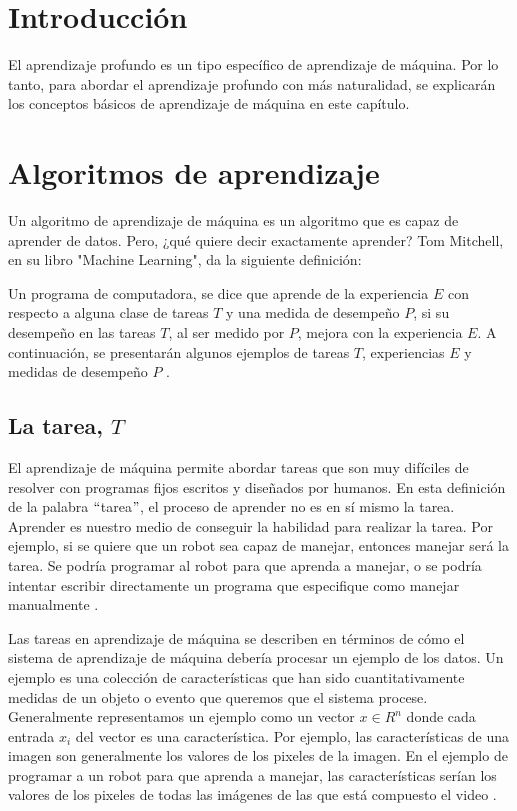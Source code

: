 \section{Introducción}
El aprendizaje profundo es un tipo específico de aprendizaje de máquina. Por lo tanto, para abordar el aprendizaje profundo con más naturalidad, se explicarán los conceptos básicos de aprendizaje de máquina en este capítulo.

\section{Algoritmos de aprendizaje}
Un algoritmo de aprendizaje de máquina es un algoritmo que es capaz de aprender de datos. Pero, ¿qué quiere decir exactamente aprender? Tom Mitchell, en su libro "Machine Learning", da la siguiente definición:

\begin{definition}
Un programa de computadora, se dice que aprende de la experiencia $E$ con respecto a alguna clase de tareas $T$ y una medida de desempeño $P$, si su desempeño en las tareas $T$, al ser medido por $P$, mejora con la experiencia $E$. A continuación, se presentarán algunos ejemplos de tareas $T$, experiencias $E$ y medidas de desempeño $P$ \cite{Mitchell:1997:ML:541177}.
\end{definition}


\subsection{La tarea, $T$}
El aprendizaje de máquina permite abordar tareas que son muy difíciles de resolver con programas fijos escritos y diseñados por humanos.
En esta definición de la palabra $``$tarea$"$, el proceso de aprender no es en sí mismo la tarea. Aprender es nuestro medio de conseguir la habilidad para realizar la tarea. Por ejemplo, si se quiere que un robot sea capaz de manejar, entonces manejar será la tarea. Se podría programar al robot para que aprenda a manejar, o se podría intentar escribir directamente un programa que especifique como manejar manualmente \cite{goodfellow-et-al-2016} \cite{Mitchell:1997:ML:541177}.

\vspace{1em}

Las tareas en aprendizaje de máquina se describen en términos de cómo el sistema de aprendizaje de máquina debería procesar un ejemplo de los datos. Un ejemplo es una colección de características que han sido cuantitativamente medidas de un objeto o evento que queremos que el sistema procese. Generalmente representamos un ejemplo como un vector $x \in R^n$ donde cada entrada $x_i$ del vector es una característica. Por ejemplo, las características de una imagen son generalmente los valores de los pixeles de la imagen. En el ejemplo de programar a un robot para que aprenda a manejar, las características serían los valores de los pixeles de todas las imágenes de las que está compuesto el video \cite{goodfellow-et-al-2016}.


